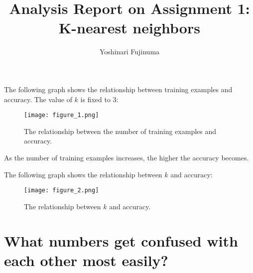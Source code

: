 \documentclass[11pt]{article}
\begin{document}
\title{Analysis Report on Assignment 1: K-nearest neighbors}
\author{Yoshinari Fujinuma}
\date{}
\maketitle

The following graph shows the relationship between training examples and accuracy. The value of $k$ is fixed to $3$:
\begin{figure}[htb]
   \begin{center}
    \scalebox{0.4}
     {\texttt{[image: figure\_1.png]}}
    \end{center}
    \caption{The relationship between the number of training examples and accuracy.}
    \label{fig:corpus_size}
\end{figure}
As the number of training examples increases, the higher the accuracy becomes.

The following graph shows the relationship between $k$ and accuracy:
\begin{figure}[htb]
   \begin{center}
    \scalebox{0.4}
     {\texttt{[image: figure\_2.png]}}
    \end{center}
    \caption{The relationship between $k$ and accuracy.}
    \label{fig:corpus_size}
\end{figure}

\section{What numbers get confused with each other most easily?}
\end{document}
